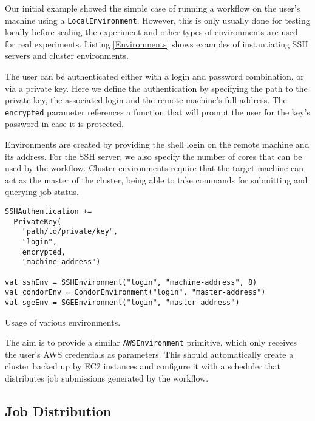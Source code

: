 Our initial example showed the simple case of running a workflow on the user's machine using a \verb|LocalEnvironment|. However, this is only usually done for testing locally before scaling the experiment and other types of environments are used for real experiments. Listing \ref{Environments} shows examples of instantiating SSH servers and cluster environments.

The user can be authenticated either with a login and password combination, or via a private key. Here we define the authentication by specifying the path to the private key, the associated login and the remote machine's full address. The \verb|encrypted| parameter references a function that will prompt the user for the key's password in case it is protected.

Environments are created by providing the shell login on the remote machine and its address. For the SSH server, we also specify the number of cores that can be used by the workflow. Cluster environments require that the target machine can act as the master of the cluster, being able to take commands for submitting and querying job status.

\begin{listing}[h]
	\centering
	\begin{minipage}{11.5cm}
		\begin{verbatim}
SSHAuthentication += 
  PrivateKey(
    "path/to/private/key",
    "login",
    encrypted, 
    "machine-address")

val sshEnv = SSHEnvironment("login", "machine-address", 8)
val condorEnv = CondorEnvironment("login", "master-address")
val sgeEnv = SGEEnvironment("login", "master-address")
		\end{verbatim}
	\end{minipage}
	\caption{Usage of various environments.}
	\label{Environments}
\end{listing}

The aim is to provide a similar \verb|AWSEnvironment| primitive, which only receives the user's AWS credentials as parameters. This should automatically create a cluster backed up by EC2 instances and configure it with a scheduler that distributes job submissions generated by the workflow.



\subsection{Job Distribution}

